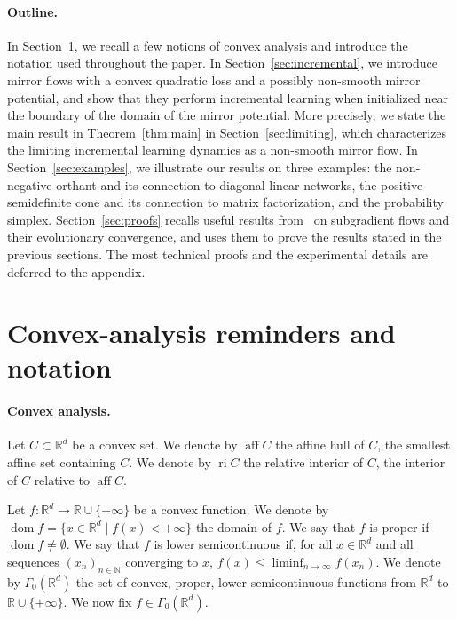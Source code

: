 \documentclass[11pt,english,reqno]{article}
\DeclareMathOperator{\dom}{dom}
\DeclareMathOperator{\ri}{ri}
\DeclareMathOperator{\aff}{aff}
\newcommand{\N}{\mathbb{N}}
\newcommand{\R}{\mathbb{R}}
\renewcommand{\leq}{\leqslant}
\theoremstyle{plain}
\theoremstyle{definition}
\theoremstyle{remark}
\numberwithin{equation}{section}
\begin{document}
\paragraph*{Outline.}

In Section~\ref{sec:notations}, we recall a few notions of convex analysis and introduce the notation used throughout the paper. In Section~\ref{sec:incremental}, we introduce mirror flows with a convex quadratic loss and a possibly non-smooth mirror potential, and show that they perform incremental learning when initialized near the boundary of the domain of the mirror potential. More precisely, we state the main result in Theorem~\ref{thm:main} in Section~\ref{sec:limiting}, which characterizes the limiting incremental learning dynamics as a non-smooth mirror flow. In Section~\ref{sec:examples}, we illustrate our results on three examples: the non-negative orthant and its connection to diagonal linear networks, the positive semidefinite cone and its connection to matrix factorization, and the probability simplex. Section~\ref{sec:proofs} recalls useful results from~\cite{brezis1973ope,attouch1977convergence} on subgradient flows and their evolutionary convergence, and uses them to prove the results stated in the previous sections. The most technical proofs and the experimental details are deferred to the appendix.


\section{Convex-analysis reminders and notation}
\label{sec:notations}

\paragraph{Convex analysis.} Let $C \subset \R^d$ be a convex set. We denote by $\aff C$ the affine hull of $C$, the smallest affine set containing $C$. We denote by $\ri C$ the relative interior of $C$, the interior of $C$ relative to $\aff C$. 

Let $f : \R^d \to \R \cup \{+\infty\}$ be a convex function. We denote by $\dom f = \{ x \in \R^d \mid f(x) < +\infty \}$ the domain of $f$. We say that $f$ is proper if $\dom f \neq \emptyset$. We say that $f$ is lower semicontinuous if, for all $x \in \R^d$ and all sequences $(x_n)_{n \in \N}$ converging to $x$, $f(x) \leq \liminf_{n\to\infty} f(x_n)$. We denote by $\Gamma_0(\R^d)$ the set of convex, proper, lower semicontinuous functions from $\R^d$ to $\R \cup \{+\infty\}$. We now fix $f \in \Gamma_0(\R^d)$. 
\end{document}
